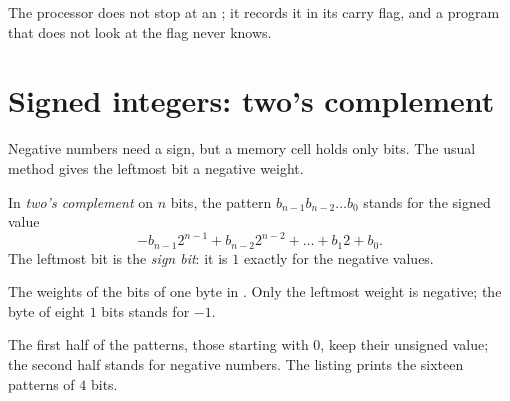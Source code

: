 \label{out:g10:machine-integers:toy-wrap}

The processor does not stop at an ; it records it in its carry flag, and a program that does not look at
the flag never knows.

\section{Signed integers: two's complement}\label{sec:g10:machine-integers:signed}

Negative numbers need a sign, but a memory cell holds only bits. The usual method gives the leftmost bit a negative
weight.

\begin{definition}\label{def:g10:machine-integers:twos-complement}
In \emph{two's complement} on $n$ bits, the pattern $b_{n-1} b_{n-2} \dots b_0$ stands for
the signed value
\[
  -b_{n-1} 2^{n-1} + b_{n-2} 2^{n-2} + \dots + b_1 2 + b_0 .
\]
The leftmost bit is the \emph{sign bit}: it is $1$ exactly for the negative values.
\end{definition}

\begin{omfigure}

{\small The weights of the bits of one byte in . Only the leftmost weight is negative; the byte
of eight $1$ bits stands for $-1$.}
\end{omfigure}

The first half of the patterns, those starting with $0$, keep their unsigned value; the second half stands for
negative numbers. The listing prints the sixteen patterns of $4$ bits.

